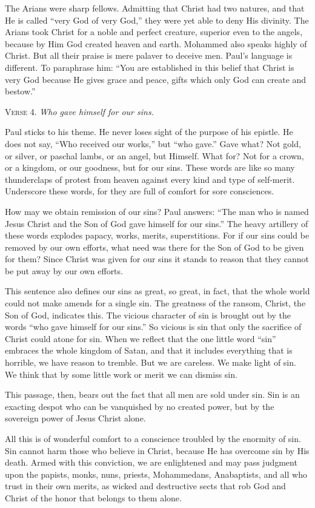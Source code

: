 The Arians were sharp fellows. Admitting that Christ had two natures, and that He is called “very God of very God,” they were yet able to deny His divinity. The Arians took Christ for a noble and perfect creature, superior even to the angels, because by Him God created heaven and earth. Mohammed also speaks highly of Christ. But all their praise is mere palaver to deceive men. Paul’s language is different. To paraphrase him: “You are established in this belief that Christ is very God because He gives grace and peace, gifts which only God can create and bestow.”

\textsc{Verse} 4. \emph{Who gave himself for our sins.}

Paul sticks to his theme. He never loses sight of the purpose of his epistle. He does not say, “Who received our works,” but “who gave.” Gave what? Not gold, or silver, or paschal lambs, or an angel, but Himself. What for? Not for a crown, or a kingdom, or our goodness, but for our sins. These words are like so many thunderclaps of protest from heaven against every kind and type of self-merit. Underscore these words, for they are full of comfort for sore consciences.

How may we obtain remission of our sins? Paul answers: “The man who is named Jesus Christ and the Son of God gave himself for our sins.” The heavy artillery of these words explodes papacy, works, merits, superstitions. For if our sins could be removed by our own efforts, what need was there for the Son of God to be given for them? Since Christ was given for our sins it stands to reason that they cannot be put away by our own efforts.

This sentence also defines our sins as great, so great, in fact, that the whole world could not make amends for a single sin. The greatness of the ransom, Christ, the Son of God, indicates this. The vicious character of sin is brought out by the words “who gave himself for our sins.” So vicious is sin that only the sacrifice of Christ could atone for sin. When we reflect that the one little word “sin” embraces the whole kingdom of Satan, and that it includes everything that is horrible, we have reason to tremble. But we are careless. We make light of sin. We think that by some little work or merit we can dismiss sin.

This passage, then, bears out the fact that all men are sold under sin. Sin is an exacting despot who can be vanquished by no created power, but by the sovereign power of Jesus Christ alone.

All this is of wonderful comfort to a conscience troubled by the enormity of sin. Sin cannot harm those who believe in Christ, because He has overcome sin by His death. Armed with this conviction, we are enlightened and may pass judgment upon the papists, monks, nuns, priests, Mohammedans, Anabaptists, and all who trust in their own merits, as wicked and destructive sects that rob God and Christ of the honor that belongs to them alone.

